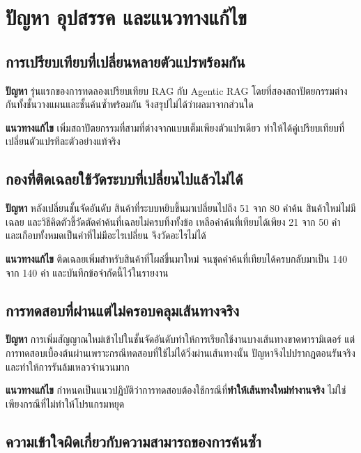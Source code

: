 \section{ปัญหา อุปสรรค และแนวทางแก้ไข}

\subsection{การเปรียบเทียบที่เปลี่ยนหลายตัวแปรพร้อมกัน}

\textbf{ปัญหา} รุ่นแรกของการทดลองเปรียบเทียบ RAG กับ Agentic RAG โดยที่สองสถาปัตยกรรมต่างกันทั้งชั้นวางแผนและชั้นค้นซ้ำพร้อมกัน จึงสรุปไม่ได้ว่าผลมาจากส่วนใด

\textbf{แนวทางแก้ไข} เพิ่มสถาปัตยกรรมที่สามที่ต่างจากแบบเต็มเพียงตัวแปรเดียว ทำให้ได้คู่เปรียบเทียบที่เปลี่ยนตัวแปรทีละตัวอย่างแท้จริง

\subsection{กองที่ติดเฉลยใช้วัดระบบที่เปลี่ยนไปแล้วไม่ได้}

\textbf{ปัญหา} หลังเปลี่ยนชั้นจัดอันดับ สินค้าที่ระบบหยิบขึ้นมาเปลี่ยนไปถึง 51 จาก 80 คำค้น สินค้าใหม่ไม่มีเฉลย และวิธีคิดตัวชี้วัดตัดคำค้นที่เฉลยไม่ครบทิ้งทั้งข้อ เหลือคำค้นที่เทียบได้เพียง 21 จาก 50 คำ และเกือบทั้งหมดเป็นคำที่ไม่มีอะไรเปลี่ยน จึงวัดอะไรไม่ได้

\textbf{แนวทางแก้ไข} ติดเฉลยเพิ่มสำหรับสินค้าที่โผล่ขึ้นมาใหม่ จนชุดคำค้นที่เทียบได้ครบกลับมาเป็น 140 จาก 140 คำ และบันทึกข้อจำกัดนี้ไว้ในรายงาน

\subsection{การทดสอบที่ผ่านแต่ไม่ครอบคลุมเส้นทางจริง}

\textbf{ปัญหา} การเพิ่มสัญญาณใหม่เข้าไปในชั้นจัดอันดับทำให้การเรียกใช้งานบางเส้นทางขาดพารามิเตอร์ แต่การทดสอบเบื้องต้นผ่านเพราะกรณีทดสอบที่ใช้ไม่ได้วิ่งผ่านเส้นทางนั้น ปัญหาจึงไปปรากฏตอนรันจริงและทำให้การรันล้มเหลวจำนวนมาก

\textbf{แนวทางแก้ไข} กำหนดเป็นแนวปฏิบัติว่าการทดสอบต้องใช้กรณีที่\textbf{ทำให้เส้นทางใหม่ทำงานจริง} ไม่ใช่เพียงกรณีที่ไม่ทำให้โปรแกรมหยุด

\subsection{ความเข้าใจผิดเกี่ยวกับความสามารถของการค้นซ้ำ}

